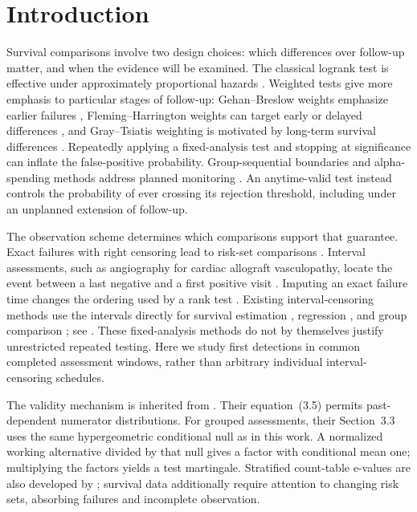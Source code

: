 \documentclass[12pt]{article}
\theoremstyle{definition}
\theoremstyle{remark}
\begin{document}
\section{Introduction}
\label{sec:introduction}

Survival comparisons involve two design choices: which differences over follow-up matter, and when the evidence will be examined. The classical logrank test is effective under approximately proportional hazards \citep{Mantel1966,Cox1972}. Weighted tests give more emphasis to particular stages of follow-up: Gehan--Breslow weights emphasize earlier failures \citep{Gehan1965}, Fleming--Harrington weights can target early or delayed differences \citep{HarringtonFleming1982}, and Gray--Tsiatis weighting is motivated by long-term survival differences \citep{GrayTsiatis1989}. Repeatedly applying a fixed-analysis test and stopping at significance can inflate the false-positive probability. Group-sequential boundaries and alpha-spending methods address planned monitoring \citep{OBrienFleming1979,LanDeMets1983,Slud1984}. An anytime-valid test instead controls the probability of ever crossing its rejection threshold, including under an unplanned extension of follow-up.

The observation scheme determines which comparisons support that guarantee. Exact failures with right censoring lead to risk-set comparisons \citep{AndersenEtAl1993}. Interval assessments, such as angiography for cardiac allograft vasculopathy, locate the event between a last negative and a first positive visit \citep{SharplesEtAl2003}. Imputing an exact failure time changes the ordering used by a rank test \citep{LawBrookmeyer1992}. Existing interval-censoring methods use the intervals directly for survival estimation \citep{Turnbull1976}, regression \citep{Finkelstein1986}, and group comparison \citep{Sun1996,FayShaw2010}; see \citet{Sun2006}. These fixed-analysis methods do not by themselves justify unrestricted repeated testing. Here we study first detections in common completed assessment windows, rather than arbitrary individual interval-censoring schedules.

The validity mechanism is inherited from \citet{TerSchureEtAl2024}. Their equation~(3.5) permits past-dependent numerator distributions. For grouped assessments, their Section~3.3 uses the same hypergeometric conditional null as in this work. A normalized working alternative divided by that null gives a factor with conditional mean one; multiplying the factors yields a test martingale. Stratified count-table e-values are also developed by \citet{TurnerGrunwald2023}; survival data additionally require attention to changing risk sets, absorbing failures and incomplete observation.
\end{document}

